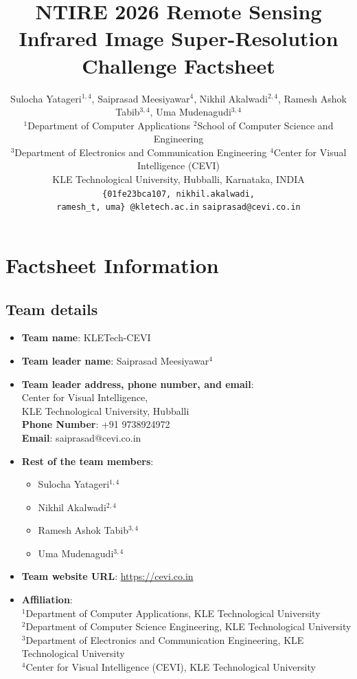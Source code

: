 \documentclass[conference]{IEEEtran}
\title{NTIRE 2026 Remote Sensing Infrared Image Super-Resolution Challenge Factsheet\\}
\author{Sulocha Yatageri$^{1,4}$, Saiprasad Meesiyawar$^{4}$, Nikhil Akalwadi$^{2,4}$, Ramesh Ashok Tabib$^{3,4}$, Uma Mudenagudi$^{3,4}$\\
{\normalsize \(^1\)Department of Computer Applications} {\normalsize \(^2\)School of Computer Science and Engineering} \\
{\normalsize \(^3\)Department of Electronics and Communication Engineering} {\normalsize \(^4\)Center for Visual Intelligence (CEVI)}\\
KLE Technological University, Hubballi, Karnataka, INDIA\\
[6pt]
\texttt{{\{01fe23bca107,}
\texttt{nikhil.akalwadi,}\\
\texttt{ramesh\_t, uma\}}
@kletech.ac.in}
\texttt{saiprasad@cevi.co.in}
}
\begin{document}
\maketitle

\section{Factsheet Information}

\subsection{Team details}

\begin{itemize}

\item \textbf{Team name}: KLETech-CEVI

\item \textbf{Team leader name}: Saiprasad Meesiyawar$^{4}$

\item \textbf{Team leader address, phone number, and email}:\\
Center for Visual Intelligence,\\
KLE Technological University, Hubballi\\
\textbf{Phone Number}: +91 9738924972\\
\textbf{Email}: saiprasad@cevi.co.in

\item \textbf{Rest of the team members}:
\begin{itemize}
\item Sulocha Yatageri$^{1,4}$
\item Nikhil Akalwadi$^{2,4}$
\item Ramesh Ashok Tabib$^{3,4}$
\item Uma Mudenagudi$^{3,4}$
\end{itemize}

\item \textbf{Team website URL}: \href{https://cevi.co.in}{https://cevi.co.in}

\item \textbf{Affiliation}:\\
$^1$Department of Computer Applications, KLE Technological University\\
$^2$Department of Computer Science Engineering, KLE Technological University\\
$^3$Department of Electronics and Communication Engineering, KLE Technological University\\
$^4$Center for Visual Intelligence (CEVI), KLE Technological University


\end{itemize}
\end{document}
